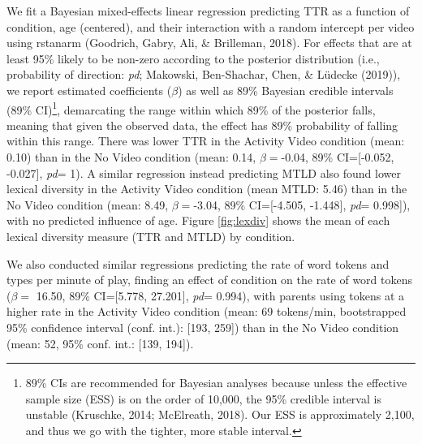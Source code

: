 \documentclass[man,floatsintext]{apa6}
\begin{document}
We fit a Bayesian mixed-effects linear regression predicting TTR as a function of condition, age (centered), and their interaction with a random intercept per video using rstanarm (Goodrich, Gabry, Ali, \& Brilleman, 2018).
For effects that are at least 95\% likely to be non-zero according to the posterior distribution (i.e., probability of direction: \emph{pd}; Makowski, Ben-Shachar, Chen, \& Lüdecke (2019)), we report estimated coefficients (\(\beta\)) as well as 89\% Bayesian credible intervals (89\% CI)\footnote{89\% CIs are recommended for Bayesian analyses because unless the effective sample size (ESS) is on the order of 10,000, the 95\% credible interval is unstable (Kruschke, 2014; McElreath, 2018). Our ESS is approximately 2,100, and thus we go with the tighter, more stable interval.}, demarcating the range within which 89\% of the posterior falls, meaning that given the observed data, the effect has 89\% probability of falling within this range.
There was lower TTR in the Activity Video condition (mean: 0.10) than in the No Video condition (mean: 0.14, \(\beta=\)-0.04, 89\% CI={[}-0.052, -0.027{]}, \emph{pd}= 1).
A similar regression instead predicting MTLD also found lower lexical diversity in the Activity Video condition (mean MTLD: 5.46) than in the No Video condition (mean: 8.49, \(\beta=\)-3.04, 89\% CI={[}-4.505, -1.448{]}, \emph{pd}= 0.998{]}), with no predicted influence of age.
Figure \ref{fig:lexdiv} shows the mean of each lexical diversity measure (TTR and MTLD) by condition.

We also conducted similar regressions predicting the rate of word tokens and types per minute of play, finding an effect of condition on the rate of word tokens (\(\beta=\) 16.50, 89\% CI={[}5.778, 27.201{]}, \emph{pd}= 0.994), with parents using tokens at a higher rate in the Activity Video condition (mean: 69 tokens/min, bootstrapped 95\% confidence interval (conf. int.): {[}193, 259{]}) than in the No Video condition (mean: 52, 95\% conf. int.: {[}139, 194{]}).
\end{document}
